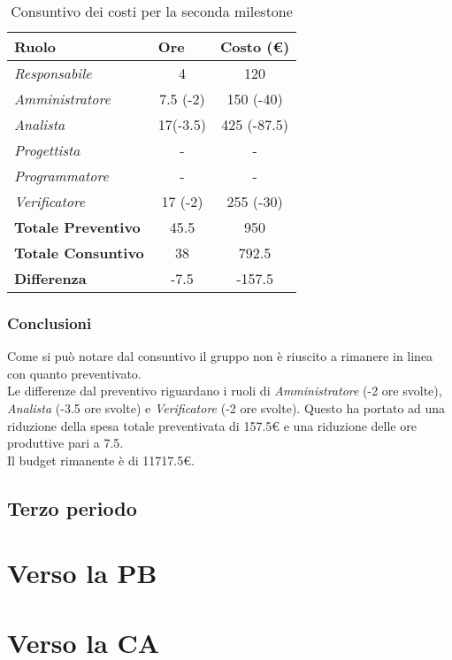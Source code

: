 \begin{table}[!ht]
    \centering
    \begin{tabular}{|l|c|c|}
    \hline
    \textbf{Ruolo} & \multicolumn{1}{l|}{\textbf{Ore}} & \multicolumn{1}{l|}{\textbf{Costo (€)}} \\ \hline
    \textit{Responsabile}      & 4         & 120         \\ \hline
    \textit{Amministratore}    & 7.5 (-2)  & 150 (-40)   \\ \hline
    \textit{Analista}          & 17(-3.5)  & 425 (-87.5) \\ \hline
    \textit{Progettista}       & -         & -           \\ \hline
    \textit{Programmatore}     & -         & -           \\ \hline
    \textit{Verificatore}      & 17 (-2)   & 255 (-30)   \\ \hline
    \textbf{Totale Preventivo} & 45.5      & 950         \\ \hline
    \textbf{Totale Consuntivo} & 38        & 792.5       \\ \hline
    \textbf{Differenza}        & -7.5      & -157.5      \\ \hline
    \end{tabular}
    \caption{Consuntivo dei costi per la seconda milestone}
\end{table}

\subsubsection{Conclusioni}
Come si può notare dal consuntivo il gruppo non è riuscito a rimanere in linea con quanto preventivato.
\\Le differenze dal preventivo riguardano i ruoli di \textit{Amministratore} (-2 ore svolte), \textit{Analista} (-3.5 ore svolte) e \textit{Verificatore} (-2 ore svolte).
Questo ha portato ad una riduzione della spesa totale preventivata di 157.5€ e una riduzione delle ore produttive pari a 7.5.
\\Il budget rimanente è di \num{11717,5}€.


\subsection{Terzo periodo}

\section{Verso la PB}

\section{Verso la CA}